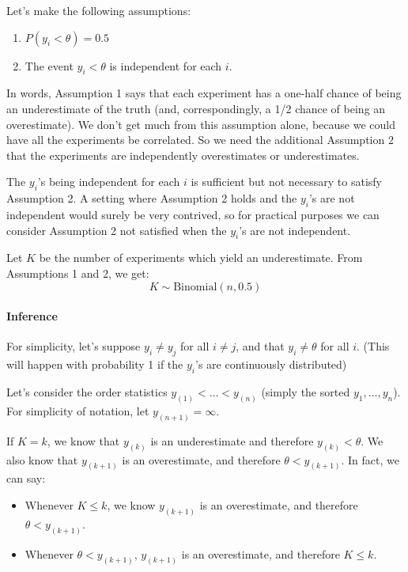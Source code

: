 \documentclass[12pt]{article}
\begin{document}
Let's make the following assumptions:

\begin{enumerate}
\item $P(y_i<\theta)=0.5$
\item The event $y_i<\theta$ is independent for each $i$.
\end{enumerate}

In words, Assumption 1 says that each experiment has a one-half chance of being an underestimate of the truth (and, correspondingly, a 1/2 chance of being an overestimate). We don't get much from this assumption alone, because we could have all the experiments be correlated. So we need the additional Assumption 2 that the experiments are independently overestimates or underestimates.

The $y_i$'s being independent for each $i$ is sufficient but not necessary to satisfy Assumption 2. A setting where Assumption 2 holds and the $y_i$'s are not independent would surely be very contrived, so for practical purposes we can consider Assumption 2 not satisfied when the $y_i$'s are not independent.

Let $K$ be the number of experiments which yield an underestimate. From Assumptions 1 and 2, we get:
\begin{equation*}K\sim\mathrm{Binomial}(n,0.5)\end{equation*}

\paragraph{Inference}\label{inference-3}

For simplicity, let's suppose $y_i\neq y_j$ for all $i\neq j$, and that $y_i\neq \theta$ for all $i$. (This will happen with probability 1 if the $y_i$'s are continuously distributed)

Let's consider the order statistics $y_{(1)}<\ldots< y_{(n)}$ (simply the sorted $y_1,\ldots,y_n$). For simplicity of notation, let $y_{(n+1)}=\infty$.

If $K=k$, we know that $y_{(k)}$ is an underestimate and therefore $y_{(k)}< \theta$. We also know that $y_{(k+1)}$ is an overestimate, and therefore $\theta < y_{(k+1)}$. In fact, we can say:

\begin{itemize}
\item
  Whenever $K\leq k$, we know $y_{(k+1)}$ is an overestimate, and therefore $\theta<y_{(k+1)}$.
\item
  Whenever $\theta<y_{(k+1)}$, $y_{(k+1)}$ is an overestimate, and therefore $K\leq k$.
\end{itemize}
\end{document}
